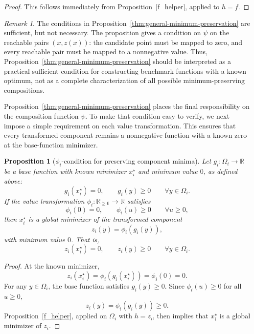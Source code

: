 \documentclass[11pt,a4paper]{article}
\theoremstyle{remark}
\newtheorem{remark}{Remark}
\theoremstyle{plain}
\newtheorem{proposition}{Proposition}
\begin{document}
\begin{proof}
	This follows immediately from Proposition~\ref{f_helper}, applied to
	\(h=f\). 
\end{proof}

\begin{remark}
	The conditions in Proposition~\ref{thm:general-minimum-preservation} are
	sufficient, but not necessary. The proposition gives a condition on
	\(\psi\) on the reachable pairs \((x,z(x))\): the candidate point must be
	mapped to zero, and every reachable pair must be mapped to a nonnegative
	value. Thus, Proposition~\ref{thm:general-minimum-preservation} should be interpreted as
	a practical sufficient condition for constructing benchmark functions with a
	known optimum, not as a complete characterization of all possible
	minimum-preserving compositions.
\end{remark}


Proposition~\ref{thm:general-minimum-preservation} places the final
responsibility on the composition function \(\psi\). To make that condition
easy to verify, we next impose a simple requirement on each value
transformation. This ensures that every transformed component remains a
nonnegative function with a known zero at the base-function minimizer.

\begin{proposition}[\(\phi_i\)-condition for preserving component minima]
	\label{prop:minimum-preserving-value-transformations}
	Let \(g_i:\Omega_i\to\mathbb{R}\) be a base function with known minimizer
	\(x_i^\star\) and minimum value \(0\), as defined above:
	\[
	g_i(x_i^\star)=0,
	\qquad
	g_i(y)\ge0
	\qquad
	\forall y\in\Omega_i.
	\]
	If the value transformation \(\phi_i:\mathbb{R}_{\ge0}\to\mathbb{R}\)
	satisfies
	\[
	\phi_i(0)=0,
	\qquad
	\phi_i(u)\ge0
	\qquad
	\forall u\ge0,
	\]
	then \(x_i^\star\) is a global minimizer of the transformed component
	\[
	z_i(y)=\phi_i(g_i(y)),
	\]
	with minimum value \(0\). That is,
	\[
	z_i(x_i^\star)=0,
	\qquad
	z_i(y)\ge0
	\qquad
	\forall y\in\Omega_i.
	\]
\end{proposition}

\begin{proof}
	At the known minimizer,
	\[
	z_i(x_i^\star)
	=
	\phi_i(g_i(x_i^\star))
	=
	\phi_i(0)
	=
	0.
	\]
	For any \(y\in\Omega_i\), the base function satisfies
	\(g_i(y)\ge0\). Since \(\phi_i(u)\ge0\) for all \(u\ge0\),
	\[
	z_i(y)
	=
	\phi_i(g_i(y))
	\ge0.
	\]
	Proposition~\ref{f_helper}, applied on \(\Omega_i\) with \(h=z_i\), then
	implies that \(x_i^\star\) is a global minimizer of \(z_i\).
\end{proof}
\end{document}

